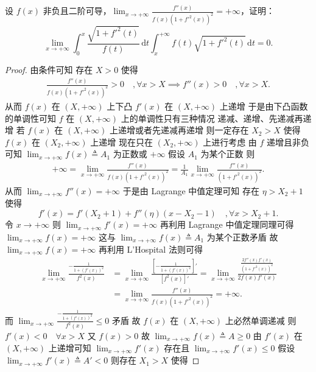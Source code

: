\documentclass[../../main.tex]{subfiles}
\begin{document}
\vspace{0.5cm}

\begin{example}
设 \( f(x) \) 非负且二阶可导，\( \lim_{x \to +\infty} \frac{f''(x)}{f(x)(1 + f'^2(x))^2} = +\infty \)，证明：
\[
\lim_{x \to +\infty} \int_0^x \frac{\sqrt{1 + f'^2(t)}}{f(t)} \, \mathrm{d}t \int_x^{+\infty} f(t) \sqrt{1 + f'^2(t)} \, \mathrm{d}t = 0.
\] 
\end{example}
\begin{proof}
由条件可知 存在 \( X > 0 \) 使得
\begin{align*}
\frac{f''(x)}{f(x)(1 + f'^2(x))^2} > 0 \quad ,\forall x > X \implies f''(x) > 0 \quad ,\forall x > X.
\end{align*}
从而 \( f(x) \) 在 \( (X, +\infty) \) 上下凸 \( f'(x) \) 在 \( (X, +\infty) \) 上递增 于是由下凸函数的单调性可知 \( f \) 在 \( (X, +\infty) \) 上的单调性只有三种情况 递减、递增、先递减再递增 若 \( f(x) \) 在 \( (X, +\infty) \) 上递增或者先递减再递增 则一定存在 \( X_2 > X \) 使得 \( f(x) \) 在 \( (X_2, +\infty) \) 上递增 现在只在 \( (X_2, +\infty) \) 上进行考虑 由 \( f \) 递增且非负可知 \( \lim_{x \to +\infty} f(x) \triangleq A_1 \) 为正数或 \( +\infty \) 假设 \( A_1 \) 为某个正数 则
\begin{align*}
+\infty = \lim_{x \to +\infty} \frac{f''(x)}{f(x)(1 + f'^2(x))^2} = \frac{1}{A_1} \lim_{x \to +\infty} \frac{f''(x)}{(1 + f'^2(x))^2}.
\end{align*}
从而 \( \lim_{x \to +\infty} f''(x) = +\infty \) 于是由 Lagrange 中值定理可知 存在 \( \eta > X_2 + 1 \) 使得
\[
f'(x) = f'(X_2 + 1) + f''(\eta)(x - X_2 - 1) \quad, \forall x > X_2 + 1.
\]
令 \( x \to +\infty \) 则 \( \lim_{x \to +\infty} f'(x) = +\infty \) 再利用 Lagrange 中值定理同理可得 \( \lim_{x \to +\infty} f(x) = +\infty \) 这与 \( \lim_{x \to +\infty} f(x) \triangleq A_1 \) 为某个正数矛盾 故 \( \lim_{x \to +\infty} f(x) = +\infty \) 再利用 L’Hospital 法则可得
\begin{align*}
\lim_{x \to +\infty} \frac{-\frac{1}{1 + (f'(x))^2}}{f^2(x)} &= \lim_{x \to +\infty} \frac{\left[ -\frac{1}{1 + (f'(x))^2} \right]'}{\left[ f^2(x) \right]'} = \lim_{x \to +\infty} \frac{\frac{2f''(x)f'(x)}{(1 + f'^2(x))^2}}{2f(x)f'(x)} \\
&= \lim_{x \to +\infty} \frac{f''(x)}{f(x)(1 + f'^2(x))^2} = +\infty.
\end{align*}
而 \( \lim_{x \to +\infty} \frac{-\frac{1}{1 + (f'(x))^2}}{f^2(x)} \leqslant 0 \) 矛盾 故 \( f(x) \) 在 \( (X, +\infty) \) 上必然单调递减 则 \( f'(x) < 0 \quad \forall x > X \) 又 \( f(x) > 0 \) 故 \( \lim_{x \to +\infty} f(x) \triangleq A \geqslant 0 \) 由 \( f'(x) \) 在 \( (X, +\infty) \) 上递增可知 \( \lim_{x \to +\infty} f'(x) \) 存在且 \( \lim_{x \to +\infty} f'(x) \leqslant 0 \) 假设 \( \lim_{x \to +\infty} f'(x) \triangleq A' < 0 \) 则存在 \( X_1 > X \) 使得

\end{proof}
\end{document}
